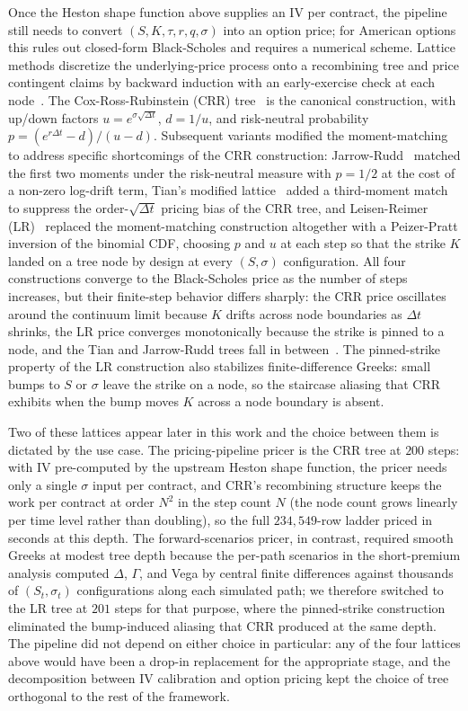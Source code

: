 Once the Heston shape function above supplies an IV per contract, the pipeline still needs to convert $(S, K, \tau, r, q, \sigma)$ into an option price; for American options this rules out closed-form Black-Scholes and requires a numerical scheme. Lattice methods discretize the underlying-price process onto a recombining tree and price contingent claims by backward induction with an early-exercise check at each node~\cite{broadie1996}. The Cox-Ross-Rubinstein (CRR) tree~\cite{cox1979} is the canonical construction, with up/down factors $u = e^{\sigma\sqrt{\Delta t}}$, $d = 1/u$, and risk-neutral probability $p = (e^{r\Delta t} - d)/(u - d)$. Subsequent variants modified the moment-matching to address specific shortcomings of the CRR construction: Jarrow-Rudd~\cite{jarrow1983} matched the first two moments under the risk-neutral measure with $p = 1/2$ at the cost of a non-zero log-drift term, Tian's modified lattice~\cite{tian1993} added a third-moment match to suppress the order-$\sqrt{\Delta t}$ pricing bias of the CRR tree, and Leisen-Reimer (LR)~\cite{leisen1996} replaced the moment-matching construction altogether with a Peizer-Pratt inversion of the binomial CDF, choosing $p$ and $u$ at each step so that the strike $K$ landed on a tree node by design at every $(S, \sigma)$ configuration. All four constructions converge to the Black-Scholes price as the number of steps increases, but their finite-step behavior differs sharply: the CRR price oscillates around the continuum limit because $K$ drifts across node boundaries as $\Delta t$ shrinks, the LR price converges monotonically because the strike is pinned to a node, and the Tian and Jarrow-Rudd trees fall in between~\cite{leisen1996,broadie1996}. The pinned-strike property of the LR construction also stabilizes finite-difference Greeks: small bumps to $S$ or $\sigma$ leave the strike on a node, so the staircase aliasing that CRR exhibits when the bump moves $K$ across a node boundary is absent.

Two of these lattices appear later in this work and the choice between them is dictated by the use case. The pricing-pipeline pricer is the CRR tree at $200$ steps: with IV pre-computed by the upstream Heston shape function, the pricer needs only a single $\sigma$ input per contract, and CRR's recombining structure keeps the work per contract at order $N^2$ in the step count $N$ (the node count grows linearly per time level rather than doubling), so the full $234{,}549$-row ladder priced in seconds at this depth. The forward-scenarios pricer, in contrast, required smooth Greeks at modest tree depth because the per-path scenarios in the short-premium analysis computed $\Delta$, $\Gamma$, and Vega by central finite differences against thousands of $(S_t, \sigma_t)$ configurations along each simulated path; we therefore switched to the LR tree at $201$ steps for that purpose, where the pinned-strike construction eliminated the bump-induced aliasing that CRR produced at the same depth. The pipeline did not depend on either choice in particular: any of the four lattices above would have been a drop-in replacement for the appropriate stage, and the decomposition between IV calibration and option pricing kept the choice of tree orthogonal to the rest of the framework.

